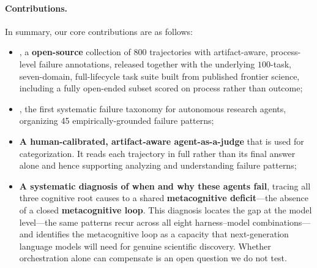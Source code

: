 \paragraph{Contributions.}
In summary, our core contributions are as follows:

\begin{itemize}
    \item \textbf{\bench}, a \textbf{open-source} collection of $800$ trajectories with
    artifact-aware, process-level failure annotations, released together
    with the underlying $100$-task, seven-domain, full-lifecycle task suite
    built from published frontier science, including a fully open-ended
    subset scored on process rather than outcome;
    
    \item \textbf{\taxonomy}, the first systematic failure taxonomy for autonomous research agents, organizing 45 empirically-grounded failure patterns;

    \item \textbf{A human-calibrated, artifact-aware agent-as-a-judge}
    that is used for \taxonomy categorization. It reads each trajectory in full rather than its final answer alone and hence supporting analyzing and understanding failure patterns;

    \item \textbf{A systematic diagnosis of when and why these agents fail},
    tracing all three cognitive root causes to a shared \textbf{metacognitive
    deficit}---the absence of a closed \textbf{metacognitive loop}. 
    This diagnosis locates the gap at the model level---the same patterns recur
across all eight harness--model combinations---and identifies the metacognitive
loop as a capacity that next-generation language models will need for genuine
scientific discovery. Whether orchestration alone can compensate is an open
question we do not test.

    

  
\end{itemize}
